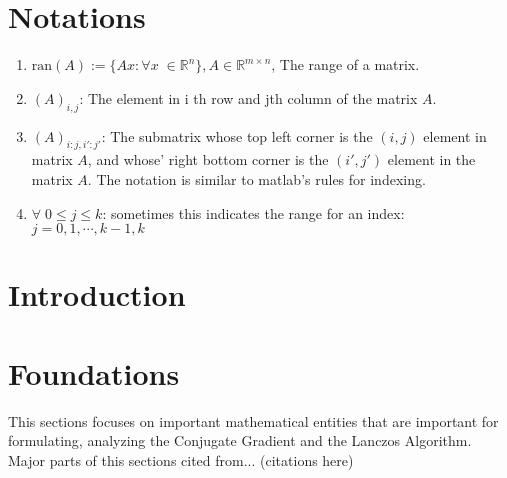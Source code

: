 \documentclass[]{article}
\theoremstyle{definition}
\begin{document}
\tableofcontents
\newpage

\section*{Notations}
\begin{enumerate}
    \item $\text{ran}(A):=\{Ax :\forall x \; \in \mathbb R^n\}, A \in \mathbb R^{m\times n}$, The range of a matrix. 
    \item $(A)_{i, j}$: The element in i th row and jth column of the matrix $A$.
    \item $(A)_{i:j, i':j'}$: The submatrix whose top left corner is the $(i, j)$ element in matrix $A$, and whose' right bottom corner is the $(i', j ')$ element in the matrix $A$. The notation is similar to matlab's rules for indexing. 
    \item $\forall\; 0\le j \le k$: sometimes this indicates the range for an index: $j = 0, 1, \cdots, k-1, k$
\end{enumerate}
\section*{Introduction}
\newpage
\section{Foundations}
    This sections focuses on important mathematical entities that are important for formulating, analyzing the Conjugate Gradient and the Lanczos Algorithm. Major parts of this sections cited from... (citations here)
\end{document}
